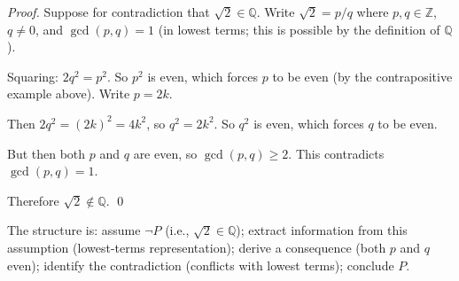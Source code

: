 \begin{example}
\textit{Proof.}
Suppose for contradiction that $\sqrt{2} \in \mathbb{Q}$.
Write $\sqrt{2} = p/q$ where $p, q \in \mathbb{Z}$, $q \neq 0$,
and $\gcd(p,q) = 1$ (in lowest terms; this is possible by the
definition of $\mathbb{Q}$).

Squaring: $2q^2 = p^2$.
So $p^2$ is even, which forces $p$ to be even (by the contrapositive
example above). Write $p = 2k$.

Then $2q^2 = (2k)^2 = 4k^2$, so $q^2 = 2k^2$.
So $q^2$ is even, which forces $q$ to be even.

But then both $p$ and $q$ are even, so $\gcd(p,q) \geq 2$.
This contradicts $\gcd(p,q) = 1$.

Therefore $\sqrt{2} \notin \mathbb{Q}$. \qed

\medskip
\noindent
The structure is: assume $\neg P$ (i.e., $\sqrt{2} \in \mathbb{Q}$);
extract information from this assumption (lowest-terms representation);
derive a consequence (both $p$ and $q$ even); identify the contradiction
(conflicts with lowest terms); conclude $P$.
\end{example}
